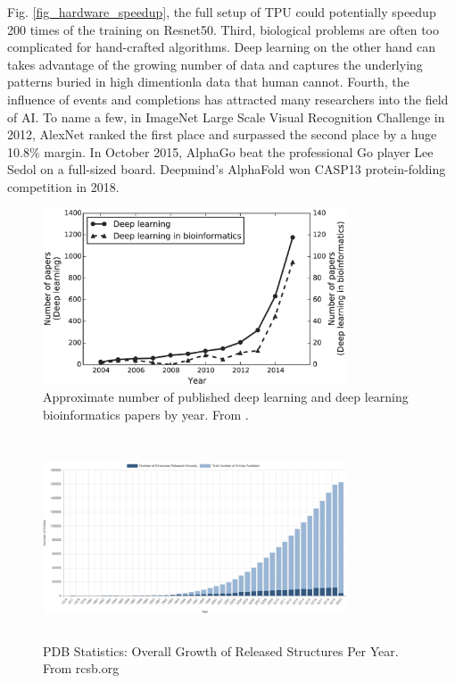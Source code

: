 Fig. \ref{fig_hardware_speedup}, the full setup of TPU could potentially speedup 200 times of the training on Resnet50. Third, biological problems are often too complicated for hand-crafted algorithms. Deep learning on the other hand can takes advantage of the growing number of data and captures the underlying patterns buried in high dimentionla data that human cannot.  Fourth, the influence of events and completions has attracted many researchers into the field of AI. To name a few, in ImageNet Large Scale Visual Recognition Challenge in 2012, AlexNet \cite{krizhevsky2012imagenet} ranked the first place and surpassed the second place by a huge 10.8\% margin. In October 2015, AlphaGo \cite{silver2017mastering} beat the professional Go player Lee Sedol on a full-sized board. Deepmind’s AlphaFold \cite{senior2020improved} won CASP13 protein-folding competition in 2018. 
\begin{figure}[h!]
\begin{center}
\includegraphics[width = 9cm]{img/deepLearning_in_bioinfo.png}
\caption{Approximate number of published deep learning and deep learning bioinformatics papers by year. From \cite{min2017deep}.  \label{fig_deelLearning_papers}}
\end{center}
\end{figure}

\begin{figure}[!h]
\begin{center}
\includegraphics[height = 6cm, width = 9cm]{img/pdb_stats.png}
\caption{PDB Statistics: Overall Growth of Released Structures Per Year. From rcsb.org \cite{berman2002protein} \label{fig_pdb_stats}}
\end{center}
\end{figure}

